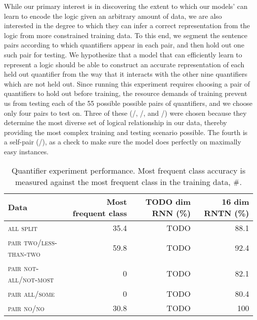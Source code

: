 
While our primary interest is in discovering the extent to which our
models' can learn to encode the logic given an arbitrary amount of
data, we are also interested in the degree to which they can infer a
correct representation from the logic from more constrained training
data. To this end, we segment the sentence pairs according to which
quantifiers appear in each pair, and then hold out one such pair for
testing. We hypothesize that a model that can efficiently learn to
represent a logic should be able to construct an accurate
representation of each held out quantifier from the way that it
interacts with the other nine quantifiers which are not held
out. Since running this experiment requires choosing a pair of
quantifiers to hold out before training, the resource demands of
training prevent us from testing each of the 55 possible possible
pairs of quantifiers, and we choose only four pairs to test on.  Three
of these (/, /, and
/) were chosen because they determine the most
diverse set of logical relationship in our data, thereby providing the
most complex training and testing scenario possible. The fourth is a
self-pair (/), as a check to make sure the model does
perfectly on maximally easy instances.

\begin{table}[htp]
  \centering
  \begin{tabular}{ l rrr }
    \toprule
    Data & Most frequent class & TODO dim RNN (\%) & 16 dim RNTN (\%)\\
    \midrule
    \textsc{all split}	& 35.4 &	TODO&	88.1 
    \\[1ex]    
    \textsc{pair two/less-than-two}	& 59.8 &	TODO &	92.4 \\
    \textsc{pair not-all/not-most}	&0 &	   TODO  &	82.1 \\
    \textsc{pair all/some}	& 0& TODO  &	80.4 \\
    \textsc{pair no/no}	& 30.8 &	TODO &	100 \\
    \bottomrule
  \end{tabular}
  \caption{Quantifier experiment performance. 
    Most frequent class accuracy is measured against the most frequent class in the training data, $\mathbin{\#}$.}
  \label{resultstable}
\end{table} 


